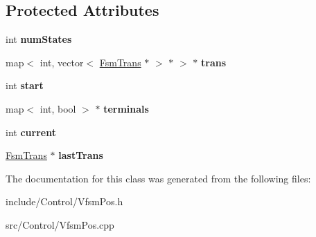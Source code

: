 \subsection*{Protected Attributes}
\begin{DoxyCompactItemize}
\item 
\hypertarget{classCartWheel_1_1VfsmPos_a6f38190b626570b6fc30dc64c11f1276}{
int {\bfseries numStates}}
\label{classCartWheel_1_1VfsmPos_a6f38190b626570b6fc30dc64c11f1276}

\item 
\hypertarget{classCartWheel_1_1VfsmPos_a2d2fbae86009c318d7184b01ad80ae75}{
map$<$ int, vector$<$ \hyperlink{classCartWheel_1_1FsmTrans}{FsmTrans} $\ast$ $>$ $\ast$ $>$ $\ast$ {\bfseries trans}}
\label{classCartWheel_1_1VfsmPos_a2d2fbae86009c318d7184b01ad80ae75}

\item 
\hypertarget{classCartWheel_1_1VfsmPos_aab12bb3228921bf892b267b9a52eed25}{
int {\bfseries start}}
\label{classCartWheel_1_1VfsmPos_aab12bb3228921bf892b267b9a52eed25}

\item 
\hypertarget{classCartWheel_1_1VfsmPos_a3c97c6699031921eda9d053411ee8ced}{
map$<$ int, bool $>$ $\ast$ {\bfseries terminals}}
\label{classCartWheel_1_1VfsmPos_a3c97c6699031921eda9d053411ee8ced}

\item 
\hypertarget{classCartWheel_1_1VfsmPos_accce3b6e05ca641e3cd24e7dac53a3a4}{
int {\bfseries current}}
\label{classCartWheel_1_1VfsmPos_accce3b6e05ca641e3cd24e7dac53a3a4}

\item 
\hypertarget{classCartWheel_1_1VfsmPos_adc8f2caa464cf968e3f367603041e465}{
\hyperlink{classCartWheel_1_1FsmTrans}{FsmTrans} $\ast$ {\bfseries lastTrans}}
\label{classCartWheel_1_1VfsmPos_adc8f2caa464cf968e3f367603041e465}

\end{DoxyCompactItemize}


The documentation for this class was generated from the following files:\begin{DoxyCompactItemize}
\item 
include/Control/VfsmPos.h\item 
src/Control/VfsmPos.cpp\end{DoxyCompactItemize}
